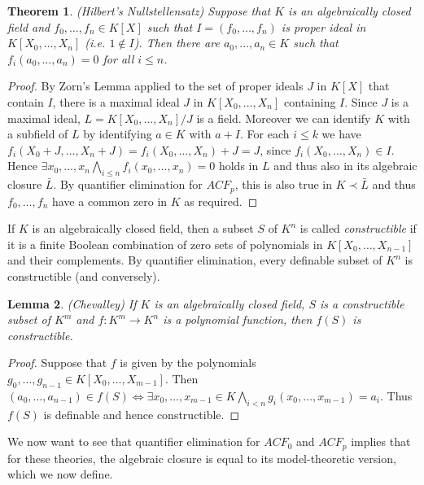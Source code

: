 \documentclass[10pt]{amsart}
\newtheorem{theorem}{Theorem}[subsection]
\newtheorem{lemma}[theorem]{Lemma}
\theoremstyle{definition}
\theoremstyle{remark}
\begin{document}
\begin{theorem} (Hilbert's Nullstellensatz) 
Suppose that $K$ is an algebraically closed field and $f_0,\dots,f_n\in K[X]$ such that $I=(f_0,\dots,f_n)$ is proper ideal in $K[X_0,\dots,X_n]$ (i.e. $1\notin I$). Then there are $a_0,\dots,a_n\in K$ such that $f_i(a_0,\dots,a_n)=0$ for all $i\leq n$. 
\end{theorem} 
\begin{proof} 
By Zorn's Lemma applied to the set of proper ideals $J$ in $K[X]$ that contain $I$, there is a maximal ideal $J$ in $K[X_0,\dots,X_n]$ containing $I$. Since $J$ is a maximal ideal, $L=K[X_0,\dots,X_n]/J$ is a field. Moreover we can identify $K$ with a subfield of $L$ by identifying $a\in K$ with $a+I$. 
For each $i\leq k$ we have $f_i(X_0+J,\dots,X_n+J)=f_i(X_0,\dots,X_n)+J=J$, since $f_i(X_0,\dots,X_n)\in I$. Hence $\exists x_0,\dots,x_n \bigwedge_{i\leq n} f_i(x_0,\dots,x_n)=0$ holds in $L$ and thus also in its algebraic closure $\bar{L}$. By quantifier elimination for $ACF_p$, this is also true in $K\prec \bar{L}$ and thus $f_0,\dots,f_n$ have a common zero in $K$ as required. 
\end{proof} 

If $K$ is an algebraically closed field, then a subset $S$ of $K^n$ is called \emph{constructible} if it is a finite Boolean combination of zero sets of polynomials in $K[X_0,\dots,X_{n-1}]$ and their complements. By quantifier elimination, every definable subset of $K^n$ is constructible (and conversely). 

\begin{lemma} (Chevalley) 
If $K$ is an algebraically closed field, $S$ is a constructible subset of $K^m$ and $f\colon K^m\rightarrow K^n$ is a polynomial function, then $f(S)$ is constructible. 
\end{lemma} 
\begin{proof} 
Suppose that $f$ is given by the polynomials $g_0,\dots,g_{n-1}\in K[X_0,\dots,X_{m-1}]$. Then $(a_0,\dots,a_{n-1})\in f(S)\Leftrightarrow \exists x_0,\dots,x_{m-1}\in K \bigwedge_{i<n} g_i(x_0,\dots,x_{m-1})=a_i$. Thus $f(S)$ is definable and hence constructible. 
\end{proof} 

We now want to see that quantifier elimination for $ACF_0$ and $ACF_p$ implies that for these theories, the algebraic closure is equal to its model-theoretic version, which we now define. 
\end{document}

